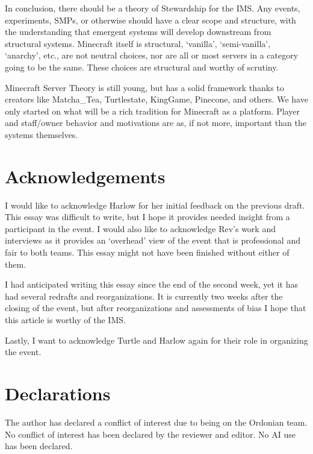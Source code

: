In conclusion, there should be a theory of Stewardship for the IMS. Any events, experiments, SMPs, or otherwise should have a clear scope and structure, with the understanding that emergent systems will develop downstream from structural systems. Minecraft itself is structural, `vanilla', `semi-vanilla', `anarchy', etc., are not neutral choices, nor are all or most servers in a category going to be the same. These choices are structural and worthy of scrutiny.

Minecraft Server Theory is still young, but has a solid framework thanks to creators like Matcha\_Tea, Turtlestate, KingGame, Pinecone, and others. We have only started on what will be a rich tradition for Minecraft as a platform. Player and staff/owner behavior and motivations are as, if not more, important than the systems themselves.

\section{Acknowledgements}
I would like to acknowledge Harlow for her initial feedback on the previous draft. This essay was difficult to write, but I hope it provides needed insight from a participant in the event. I would also like to acknowledge Rev's work and interviews as it provides an `overhead' view of the event that is professional and fair to both teams. This essay might not have been finished without either of them.

I had anticipated writing this essay since the end of the second week, yet it has had several redrafts and reorganizations. It is currently two weeks after the closing of the event, but after reorganizations and assessments of bias I hope that this article is worthy of the IMS.

Lastly, I want to acknowledge Turtle and Harlow again for their role in organizing the event.

\section{Declarations}
The author has declared a conflict of interest due to being on the Ordonian team. No conflict of interest has been declared by the reviewer and editor. No AI use has been declared.

